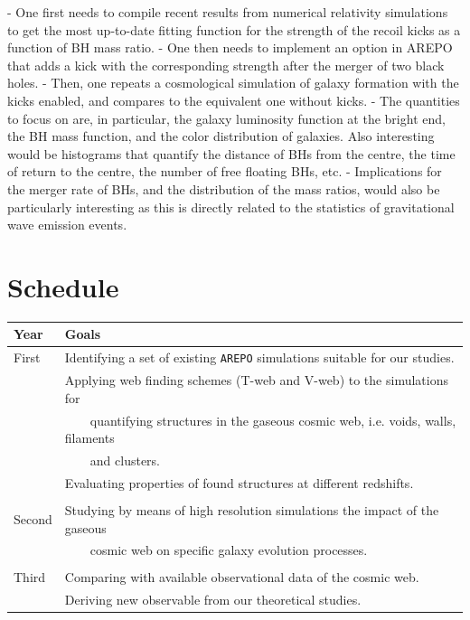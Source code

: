 \documentclass[a4,useAMS,usenatbib,usegraphicx,12pt]{article}
\begin{document}
- One first needs to compile recent results from numerical relativity simulations to get the
most up-to-date fitting function for the strength of the recoil kicks as a function of BH
mass ratio.
- One then needs to implement an option in AREPO that adds a kick with the
corresponding strength after the merger of two black holes.
- Then, one repeats a cosmological simulation of galaxy formation with the kicks enabled,
and compares to the equivalent one without kicks.
- The quantities to focus on are, in particular, the galaxy luminosity function at the bright
end, the BH mass function, and the color distribution of galaxies. Also interesting would
be histograms that quantify the distance of BHs from the centre, the time of return to the
centre, the number of free floating BHs, etc.
- Implications for the merger rate of BHs, and the distribution of the mass ratios, would
also be particularly interesting as this is directly related to the statistics of gravitational
wave emission events.



\section{Schedule}

\begin{table}[h]
\begin{flushleft}
\begin{center}
  \begin{tabular}{l  l} \hline\hline
	\centering\textbf{Year} & \textbf{Goals} \\ \hline
	First  
	& \tabitem Identifying a set of existing \texttt{AREPO} simulations suitable 
	for our studies. \\
	& \tabitem Applying web finding schemes (T-web and V-web) to the simulations 
	for\\
	& \ \ \ \ quantifying structures in the gaseous cosmic web, i.e. voids, walls, 
	filaments\\
	& \ \ \ \ and clusters.\\
	& \tabitem Evaluating properties of found structures at different redshifts.\\
	\\
	Second
	& \tabitem Studying by means of high resolution simulations the impact of the 
	gaseous\\
	& \ \ \ \ cosmic web on specific galaxy evolution processes.\\
	\\	
	Third
	& \tabitem Comparing with available observational data of the cosmic web.\\
	& \tabitem Deriving new observable from our theoretical studies.\\ 
	
	\hline\hline
  \end{tabular}  
\end{center}
\end{flushleft}
\end{table}

\newpage

\renewcommand{\bibname}{8\ \ \ \ Bibliography}
\small

\end{document}
